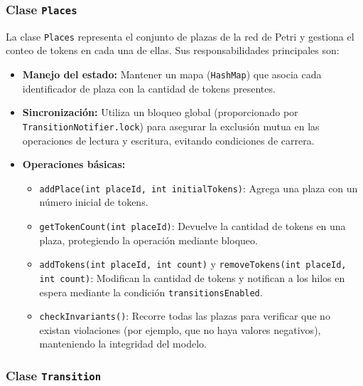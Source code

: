 \documentclass[12pt]{article}
\begin{document}
\subsubsection{Clase \texttt{Places}}

La clase \texttt{Places} representa el conjunto de plazas de la red de Petri y gestiona el conteo de tokens en cada una de ellas. Sus responsabilidades principales son:
\begin{itemize}
    \item \textbf{Manejo del estado:} Mantener un mapa (\texttt{HashMap}) que asocia cada identificador de plaza con la cantidad de tokens presentes.
    \item \textbf{Sincronización:} Utiliza un bloqueo global (proporcionado por \texttt{TransitionNotifier.lock}) para asegurar la exclusión mutua en las operaciones de lectura y escritura, evitando condiciones de carrera.
    \item \textbf{Operaciones básicas:} 
    \begin{itemize}
        \item \texttt{addPlace(int placeId, int initialTokens)}: Agrega una plaza con un número inicial de tokens.
        \item \texttt{getTokenCount(int placeId)}: Devuelve la cantidad de tokens en una plaza, protegiendo la operación mediante bloqueo.
        \item \texttt{addTokens(int placeId, int count)} y \texttt{removeTokens(int placeId, int count)}: Modifican la cantidad de tokens y notifican a los hilos en espera mediante la condición \texttt{transitionsEnabled}.
        \item \texttt{checkInvariants()}: Recorre todas las plazas para verificar que no existan violaciones (por ejemplo, que no haya valores negativos), manteniendo la integridad del modelo.
    \end{itemize}
\end{itemize}

\subsubsection{Clase \texttt{Transition}}
\end{document}
